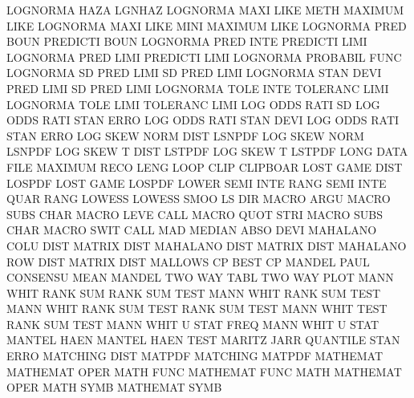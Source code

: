 LOGNORMA HAZA                           LGNHAZ
LOGNORMA MAXI LIKE METH                 MAXIMUM  LIKE
LOGNORMA MAXI LIKE MINI                 MAXIMUM  LIKE
LOGNORMA PRED BOUN                      PREDICTI BOUN
LOGNORMA PRED INTE                      PREDICTI LIMI
LOGNORMA PRED LIMI                      PREDICTI LIMI
LOGNORMA                                PROBABIL FUNC
LOGNORMA SD   PRED LIMI                 SD       PRED LIMI
LOGNORMA STAN DEVI PRED LIMI            SD       PRED LIMI
LOGNORMA TOLE INTE                      TOLERANC LIMI
LOGNORMA TOLE LIMI                      TOLERANC LIMI
LOG      ODDS RATI SD                   LOG      ODDS RATI STAN ERRO
LOG      ODDS RATI STAN DEVI            LOG      ODDS RATI STAN ERRO
LOG      SKEW NORM DIST                 LSNPDF
LOG      SKEW NORM                      LSNPDF
LOG      SKEW T    DIST                 LSTPDF
LOG      SKEW T                         LSTPDF
LONG     DATA FILE                      MAXIMUM  RECO LENG
LOOP     CLIP                           CLIPBOAR
LOST     GAME DIST                      LOSPDF
LOST     GAME                           LOSPDF
LOWER    SEMI INTE RANG                 SEMI     INTE QUAR RANG
LOWESS                                  LOWESS   SMOO
LS                                      DIR
MACRO    ARGU                           MACRO    SUBS CHAR
MACRO    LEVE                           CALL
MACRO    QUOT STRI                      MACRO    SUBS CHAR
MACRO    SWIT                           CALL
MAD                                     MEDIAN   ABSO DEVI
MAHALANO COLU DIST                      MATRIX   DIST
MAHALANO DIST                           MATRIX   DIST
MAHALANO ROW  DIST                      MATRIX   DIST
MALLOWS  CP                             BEST     CP
MANDEL   PAUL                           CONSENSU MEAN
MANDEL   TWO  WAY  TABL                 TWO      WAY  PLOT
MANN     WHIT RANK SUM                  RANK     SUM  TEST
MANN     WHIT                           RANK     SUM  TEST
MANN     WHIT RANK SUM  TEST            RANK     SUM  TEST
MANN     WHIT TEST                      RANK     SUM  TEST
MANN     WHIT U    STAT FREQ            MANN     WHIT U    STAT
MANTEL   HAEN                           MANTEL   HAEN TEST
MARITZ   JARR                           QUANTILE STAN ERRO
MATCHING DIST                           MATPDF
MATCHING                                MATPDF
MATHEMAT                                MATHEMAT OPER
MATH     FUNC                           MATHEMAT FUNC
MATH                                    MATHEMAT OPER
MATH     SYMB                           MATHEMAT SYMB
